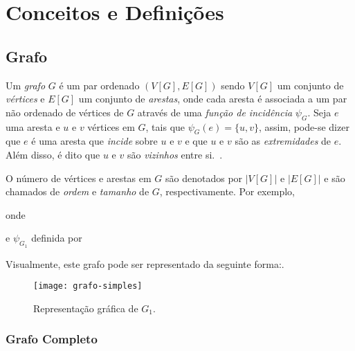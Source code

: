 \chapter{Conceitos e Defini{\c   c}{\~o}es}
\label{conceitos}

\section{Grafo}
\label{conceitos__grafo}

Um \emph{grafo} $G$ é um par ordenado $(V[G], E[G])$ sendo $V[G]$ um conjunto de \emph{vértices} e $E[G]$ um conjunto de \emph{arestas}, onde cada aresta é associada a um par não ordenado de vértices de $G$ através de uma \emph{função de incidência} $\psi_{G}$. Seja $e$ uma aresta e $u$ e $v$ vértices em $G$, tais que $\psi_{G}(e) = \{u, v\}$, assim, pode-se dizer que $e$ é uma aresta que \emph{incide} sobre $u$ e $v$ e que $u$ e $v$ são as \emph{extremidades} de $e$. Além disso, é dito que $u$ e $v$ são \emph{vizinhos} entre si.~\cite{bondy1976graph}.

O número de vértices e arestas em $G$ são denotados por $|V[G]|$ e $|E[G]|
$ e são chamados de \emph{ordem} e \emph{tamanho} de $G$, respectivamente. Por exemplo,


\noindent onde



\noindent e $\psi_{G_{1}}$ definida por



Visualmente, este grafo pode ser representado da seguinte forma:.

\begin{figure}[h]
\texttt{[image: grafo-simples]}
\centering
\caption{Representação gráfica de $G_{1}$.}
\label{fig:grafo-simples}
\end{figure}

\subsection{Grafo Completo}
\label{conceitos__grafo--comleto}

